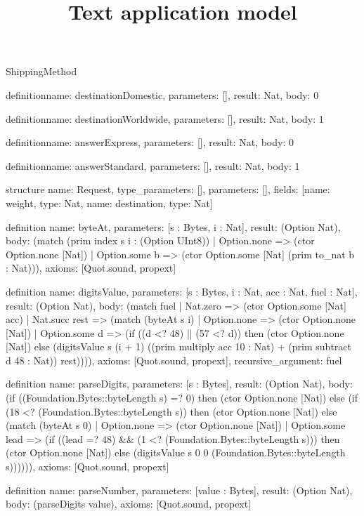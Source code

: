 \begin{lexlean}{ShippingMethod}
\title{Text application model}
\begin{semanticmodule}
definition{name: destinationDomestic, parameters: [], result: Nat, body: 0}

definition{name: destinationWorldwide, parameters: [], result: Nat, body: 1}

definition{name: answerExpress, parameters: [], result: Nat, body: 0}

definition{name: answerStandard, parameters: [], result: Nat, body: 1}

structure{
  name: Request,
  type_parameters: [],
  parameters: [],
  fields: [{name: weight, type: Nat}, {name: destination, type: Nat}]
}

definition{
  name: byteAt,
  parameters: [s : Bytes, i : Nat],
  result: (Option Nat),
  body: (match (prim index s i : (Option UInt8))
    | Option.none => (ctor Option.none [Nat])
    | Option.some b => (ctor Option.some [Nat] (prim to_nat b : Nat))),
  axioms: [Quot.sound, propext]
}

definition{
  name: digitsValue,
  parameters: [s : Bytes, i : Nat, acc : Nat, fuel : Nat],
  result: (Option Nat),
  body: (match fuel
    | Nat.zero => (ctor Option.some [Nat] acc)
    | Nat.succ rest => (match (byteAt s i)
      | Option.none => (ctor Option.none [Nat])
      | Option.some d => (if ((d <? 48) || (57 <? d)) then (ctor Option.none [Nat]) else (digitsValue s (i + 1) ((prim multiply acc 10 : Nat) + (prim subtract d 48 : Nat)) rest)))),
  axioms: [Quot.sound, propext],
  recursive_argument: fuel
}

definition{
  name: parseDigits,
  parameters: [s : Bytes],
  result: (Option Nat),
  body: (if ((Foundation.Bytes::byteLength s) =? 0) then (ctor Option.none [Nat]) else (if (18 <? (Foundation.Bytes::byteLength s)) then (ctor Option.none [Nat]) else (match (byteAt s 0)
    | Option.none => (ctor Option.none [Nat])
    | Option.some lead => (if ((lead =? 48) && (1 <? (Foundation.Bytes::byteLength s))) then (ctor Option.none [Nat]) else (digitsValue s 0 0 (Foundation.Bytes::byteLength s)))))),
  axioms: [Quot.sound, propext]
}

definition{
  name: parseNumber,
  parameters: [value : Bytes],
  result: (Option Nat),
  body: (parseDigits value),
  axioms: [Quot.sound, propext]
}


\end{semanticmodule}
\end{lexlean}
